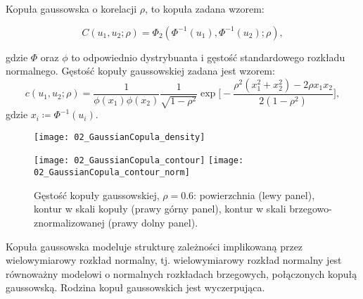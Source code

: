 \begin{df}
	Kopuła gaussowska o korelacji $\rho$, to kopuła zadana wzorem:
	
	$$ C(u_1, u_2; \rho) = \Phi_2(\Phi^{-1}(u_1), \Phi^{-1}(u_2);\rho),$$
	
	gdzie $\Phi$ oraz $\phi$ to odpowiednio dystrybuanta i gęstość standardowego rozkładu normalnego. Gęstość kopuły gaussowskiej zadana jest wzorem:
	$$ c(u_1, u_2; \rho) = \frac{1}{\phi(x_1)\phi(x_2)} \frac{1}{\sqrt{1-\rho^2}}\exp\bigg[-\frac{\rho^2(x_1^2+x_2^2) - 2\rho x_1 x_2}{2(1-\rho^2)}\bigg],$$
	gdzie $x_i\coloneqq \Phi^{-1}(u_i)$.
\end{df}
\begin{figure}[h]
	\centering
	\begin{minipage}{0.5\linewidth}
		\texttt{[image: 02\_GaussianCopula\_density]}
	\end{minipage}
	\begin{minipage}{0.45\linewidth}
		\texttt{[image: 02\_GaussianCopula\_contour]}
		\texttt{[image: 02\_GaussianCopula\_contour\_norm]}
	\end{minipage}
	\caption{Gęstość kopuły gaussowskiej, $\rho=0.6$: powierzchnia (lewy panel), kontur w skali kopuły (prawy górny panel), kontur w skali brzegowo-znormalizowanej (prawy dolny panel). \label{fig:gaussian_copula_density}}
\end{figure}

Kopuła gaussowska modeluje strukturę zależności implikowaną przez wielowymiarowy rozkład normalny, tj. wielowymiarowy rozkład normalny jest równoważny modelowi o normalnych rozkładach brzegowych, połączonych kopułą gaussowską. Rodzina kopuł gaussowskich jest wyczerpująca.

